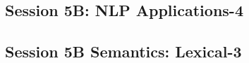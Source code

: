 \subsection{\large Session 5B: NLP Applications-4}
\label{parallel-session-5B-trackE}
\TrackELoc\hfill\sessionchair{}{}
\clearpage
\subsection{\large Session 5B Semantics: Lexical-3}
\label{parallel-session-5B-trackF}
\TrackFLoc\hfill\sessionchair{}{}
\clearpage


